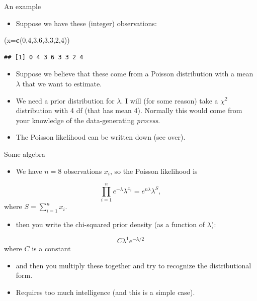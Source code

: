 \documentclass[ignorenonframetext,]{beamer}
\newenvironment{Shaded}{\begin{snugshade}}{\end{snugshade}}
\newcommand{\DataTypeTok}[1]{\textcolor[rgb]{0.13,0.29,0.53}{#1}}
\newcommand{\DecValTok}[1]{\textcolor[rgb]{0.00,0.00,0.81}{#1}}
\newcommand{\KeywordTok}[1]{\textcolor[rgb]{0.13,0.29,0.53}{\textbf{#1}}}
\newcommand{\NormalTok}[1]{#1}
\providecommand{\tightlist}{%
  \setlength{\itemsep}{0pt}\setlength{\parskip}{0pt}}
\begin{document}
\begin{frame}[fragile]{An example}
\protect\hypertarget{an-example}{}

\begin{itemize}
\tightlist
\item
  Suppose we have these (integer) observations:
\end{itemize}

\begin{Shaded}
\begin{Highlighting}[]
\NormalTok{(}\DataTypeTok{x=}\KeywordTok{c}\NormalTok{(}\DecValTok{0}\NormalTok{,}\DecValTok{4}\NormalTok{,}\DecValTok{3}\NormalTok{,}\DecValTok{6}\NormalTok{,}\DecValTok{3}\NormalTok{,}\DecValTok{3}\NormalTok{,}\DecValTok{2}\NormalTok{,}\DecValTok{4}\NormalTok{))}
\end{Highlighting}
\end{Shaded}

\begin{verbatim}
## [1] 0 4 3 6 3 3 2 4
\end{verbatim}

\begin{itemize}
\tightlist
\item
  Suppose we believe that these come from a Poisson distribution with a
  mean \(\lambda\) that we want to estimate.
\item
  We need a prior distribution for \(\lambda\). I will (for some reason)
  take a \(\chi^2\) distribution with 4 df (that has mean 4). Normally
  this would come from your knowledge of the data-generating
  \emph{process}.
\item
  The Poisson likelihood can be written down (see over).
\end{itemize}

\end{frame}

\begin{frame}{Some algebra}
\protect\hypertarget{some-algebra}{}

\begin{itemize}
\tightlist
\item
  We have \(n=8\) observations \(x_i\), so the Poisson likelihood is
\end{itemize}

\[ \prod_{i=1}^n e^{-\lambda} \lambda^{x_i} = e^{n\lambda} \lambda^S, \]
where \(S=\sum_{i=1}^n x_i\).

\begin{itemize}
\tightlist
\item
  then you write the chi-squared prior density (as a function of
  \(\lambda\)):
\end{itemize}

\[ C \lambda^1 e^{-\lambda/2} \] where \(C\) is a constant

\begin{itemize}
\item
  and then you multiply these together and try to recognize the
  distributional form.
\item
  Requires too much intelligence (and this is a simple case).
\end{itemize}

\end{frame}
\end{document}
